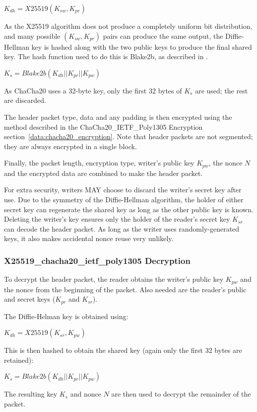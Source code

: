 \documentclass[10pt]{article}
\begin{document}
$K_{dh} = X25519(K_{sw}, K_{pr})$

As the X25519 algorithm does not produce a completely uniform bit distribution, and many possible $(K_{sw}, K_{pr})$
pairs can produce the same output, the Diffie-Hellman key is hashed along with the two public keys to produce the
final shared key.
The hash function used to do this is Blake2b, as described in \cite{RFC7693}.

$K_s = Blake2b(K_{dh} || K_{pr} || K_{pw})$

As ChaCha20 uses a 32-byte key, only the first 32 bytes of $K_s$ are used; the rest are discarded.

The header packet type, data and any padding is then encrypted using the method described in the
ChaCha20\_IETF\_Poly1305 Encryption section~\ref{data:chacha20_encryption}.
Note that header packets are not segmented; they are always encrypted in a single block.

Finally, the packet length, encryption type, writer's public key $K_{pw}$, the nonce $N$ and the encrypted data are
combined to make the header packet.

For extra security, writers MAY choose to discard the writer's secret key after use.
Due to the symmetry of the Diffie-Hellman algorithm, the holder of either secret key can regenerate the shared
key as long as the other public key is known.
Deleting the writer's key ensures only the holder of the reader's secret key $K_{sr}$ can decode the header packet.
As long as the writer uses randomly-generated keys, it also makes accidental nonce reuse very unlikely.

\subsubsection{X25519\_chacha20\_ietf\_poly1305 Decryption}

To decrypt the header packet, the reader obtains the writer's public key $K_{pw}$ and the nonce from the beginning
of the packet.
Also needed are the reader's public and secret keys ($K_{pr}$ and $K_{sr}$).

The Diffie-Helman key is obtained using:

$K_{dh} = X25519(K_{sr}, K_{pw})$

This is then hashed to obtain the shared key (again only the first 32 bytes are retained):

$K_s = Blake2b(K_{dh} || K_{pr} || K_{pw})$

The resulting key $K_s$ and nonce $N$ are then used to decrypt the remainder of the packet.
\end{document}
